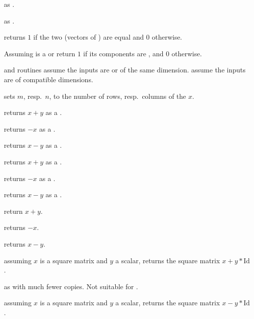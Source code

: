 as .

 as .

 returns $1$ if the two  (vectors
of ) are equal and $0$ otherwise.


 Assuming  is a 
or  return $1$ if its components are , and $0$ otherwise.




 and  routines assume the inputs are  or 
of the same dimension.  assume the inputs are  of
compatible dimensions.


 sets $m$, resp.~$n$, to
the number of rows, resp.~columns of the  $x$.

 returns $x + y$ as a .

 returns $-x$ as a .

 returns $x - y$ as a .

 returns $x + y$ as a .

 returns $-x$ as a .

 returns $x - y$ as a .

 return $x+y$.

 returns $-x$.

 returns $x-y$.

 assuming $x$ is a square matrix
and $y$ a scalar, returns the square matrix $x + y*\text{Id}$.

 as  with much
fewer copies. Not suitable for .

 assuming $x$ is a square matrix
and $y$ a scalar, returns the square matrix $x - y*\text{Id}$.

